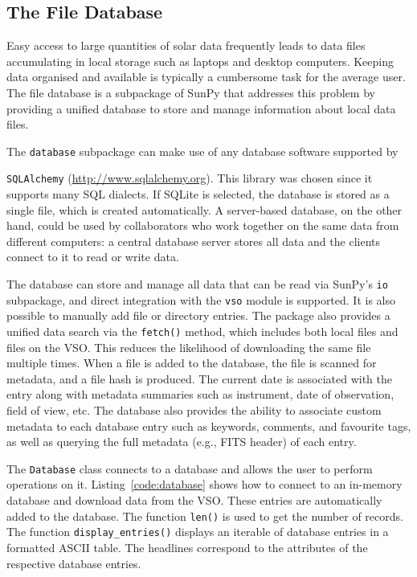 \subsection{The File Database}\label{ssec:db}

Easy access to large quantities of solar data frequently leads to data files accumulating
in local storage such as laptops and desktop computers. Keeping data organised and available
is typically a cumbersome task for the average user. The file database is a subpackage of 
SunPy that addresses this problem by providing a unified database to store and 
manage information about local data files.

The \texttt{database} subpackage can make use of any database software supported by
{\texttt{SQLAlchemy} (\href{http://www.sqlalchemy.org}{http://www.sqlalchemy.org}). This library was chosen
since it supports many SQL dialects. 
If SQLite is selected, the database is stored as a single file, which is
created automatically. A server-based database, on the other hand, could be used
by collaborators who work together on the
same data from different computers: a central database server stores all data and the clients connect to
it to read or write data.

The database can store and manage all data that can be read via SunPy's 
\texttt{io} subpackage, and direct integration with the \texttt{vso} 
module is supported.
It is also possible to manually add file or directory entries. The package also provides
a unified data search via the \texttt{fetch()} method, which includes both local files
and files on the \textsc{VSO}. This reduces the likelihood of downloading the same file 
multiple times. When a file is added to the database, the file is scanned for metadata,
and a file hash is produced. 
The current date is associated with the entry along with metadata summaries such 
as instrument, date of observation, field of view, etc. 
The database also provides the ability to associate custom metadata to 
each database entry such as keywords, comments, and favourite tags, as well as 
querying the full metadata (e.g., FITS header) of each entry.

The \texttt{Database} class connects to a database and allows the user to 
perform operations on it. Listing~\ref{code:database} shows how to connect
to an in-memory database and download data from the \textsc{VSO}. These entries are
automatically added to the database. The function \texttt{len()} is used to get the number of
records. The function \texttt{display\_entries()} displays an iterable of 
database entries in a formatted \textsc{ASCII} table. The headlines 
correspond to the attributes of the respective database entries.

}

